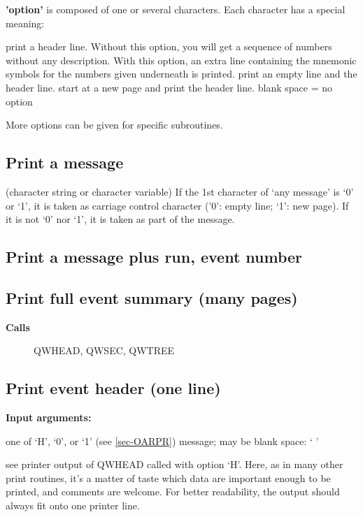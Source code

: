 {\bf 'option'} is composed of one or
several characters. Each character has a special meaning:
\begin{indentlist}{ 1.75cm}{ 2.00cm}
print a header line. Without this option, you will get a sequence
of numbers without any description. With this option, an extra
line containing the mnemonic symbols for the numbers given
underneath is printed.
print an empty line and the header line.
start at a new page and print the header line.
blank space = no option
\end{indentlist}
More options can be given for specific subroutines.
 
\subsection{\label{sec-OARPM}Print a message}
\par
{}
\par
\begin{indentlist}{ 3.50cm}{ 3.75cm}
(character string or character variable)
If the 1st character of `any message' is `0' or `1',
it is taken as carriage control character ('0': empty
line; `1': new page).
If it is not `0' nor `1', it is taken as part of the message.
\end{indentlist}
\subsection{\label{sec-OARPE}Print a message plus run, event number}
\par
{}
\par
 
\subsection{\label{sec-QWE}Print full event summary (many pages)}
\par
{}
\par
\begin{description}\item[\bf{Calls}]QWHEAD, QWSEC, QWTREE\end{description}
\subsection{\label{sec-QWH}Print event header (one line)}
\par
{}
\par
{\bf Input arguments:}
\begin{indentlist}{ 2.50cm}{ 2.75cm}
one of `H', `0', or `1' (see \ref{sec-OARPR})
message; may be blank space: ` '
 
see printer output of QWHEAD called with option `H'.
Here, as in many other print routines, it's a matter of taste
which data are important enough to be printed, and comments
are welcome. For better readability, the output should always
fit onto one printer line.
\end{indentlist}
